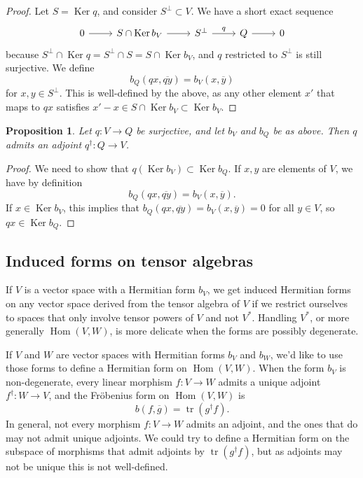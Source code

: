 \documentclass[10pt,a4paper]{amsart}
\newtheorem{prop}[theo]{Proposition}
\theoremstyle{definition}
\def\ov#1{\overline{#1}}
\DeclareMathOperator{\Ker}{Ker}
\DeclareMathOperator{\Hom}{Hom}
\DeclareMathOperator{\tr}{tr}
\begin{document}
\begin{proof}
Let $S = \Ker q$, and consider $S^\perp \subset V$. We have a short exact sequence
\[
\begin{tikzcd}
0 \ar[r] &
S \cap \Ker b_V \ar[r] &
S^\perp \ar[r,"q"] &
Q \ar[r] &
0
\end{tikzcd}
\]
because $S^\perp \cap \Ker q = S^\perp \cap S = S \cap \Ker b_V$, and $q$ restricted to $S^\perp$ is still surjective. We define
\[
b_Q(qx, \ov{qy})
= b_V(x, \ov y)
\]
for $x, y \in S^\perp$. This is well-defined by the above, as any other element $x'$ that maps to $qx$ satisfies $x' - x \in S \cap \Ker b_V \subset \Ker b_V$.
\end{proof}



\begin{prop}
Let $q : V \to Q$ be surjective, and let $b_V$ and $b_Q$ be as above. Then $q$ admits an adjoint $q^\dagger : Q \to V$.
\end{prop}

\begin{proof}
We need to show that $q(\Ker b_V) \subset \Ker b_Q$. If $x, y$ are elements of $V$, we have by definition
\[
b_Q(qx, \ov{qy}) = b_V(x, \ov y).
\]
If $x \in \Ker b_V$, this implies that $b_Q(qx, \ov{qy}) = b_V(x, \ov y) = 0$ for all $y \in V$, so $qx \in \Ker b_Q$.
\end{proof}





\subsection*{Induced forms on tensor algebras}
\label{sec:induced-forms-tensor}


If $V$ is a vector space with a Hermitian form $b_V$, we get induced Hermitian forms on any vector space derived from the tensor algebra of $V$ if we restrict ourselves to spaces that only involve tensor powers of $V$ and not $V^*$. Handling $V^*$, or more generally $\Hom(V,W)$, is more delicate when the forms are possibly degenerate.



If $V$ and $W$ are vector spaces with Hermitian forms $b_V$ and $b_W$, we'd like to use those forms to define a Hermitian form on $\Hom(V,W)$. When the form $b_V$ is non-degenerate, every linear morphism $f : V \to W$ admits a unique adjoint $f^\dagger : W \to V$, and the Fr\"obenius form on $\Hom(V,W)$ is
\[
b(f, \ov g) = \tr(g^\dagger f).
\]
In general, not every morphism $f : V \to W$ admits an adjoint, and the ones that do may not admit unique adjoints. We could try to define a Hermitian form on the subspace of morphisms that admit adjoints by $\tr(g^\dagger f)$, but as adjoints may not be unique this is not well-defined.
\end{document}
